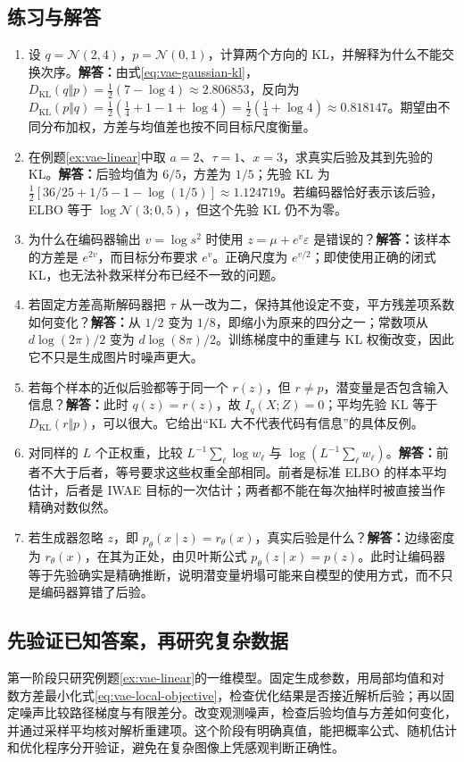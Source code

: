 \documentclass[UTF8,12pt,a4paper,fontset=fandol]{ctexart}
\begin{document}
\subsection{练习与解答}
\begin{enumerate}
 \item 设 $q=\mathcal N(2,4)$，$p=\mathcal N(0,1)$，计算两个方向的 KL，并解释为什么不能交换次序。\textbf{解答：}由式\eqref{eq:vae-gaussian-kl}，$D_{\mathrm{KL}}(q\Vert p)=\tfrac12(7-\log4)\approx2.806853$，反向为 $D_{\mathrm{KL}}(p\Vert q)=\tfrac12(\tfrac14+1-1+\log4)=\tfrac12(\tfrac14+\log4)\approx0.818147$。期望由不同分布加权，方差与均值差也按不同目标尺度衡量。
 \item 在例题\ref{ex:vae-linear}中取 $a=2$、$\tau=1$、$x=3$，求真实后验及其到先验的 KL。\textbf{解答：}后验均值为 $6/5$，方差为 $1/5$；先验 KL 为 $\tfrac12[36/25+1/5-1-\log(1/5)]\approx1.124719$。若编码器恰好表示该后验，ELBO 等于 $\log\mathcal N(3;0,5)$，但这个先验 KL 仍不为零。
 \item 为什么在编码器输出 $v=\log s^2$ 时使用 $z=\mu+e^v\varepsilon$ 是错误的？\textbf{解答：}该样本的方差是 $e^{2v}$，而目标分布要求 $e^v$。正确尺度为 $e^{v/2}$；即使使用正确的闭式 KL，也无法补救采样分布已经不一致的问题。
 \item 若固定方差高斯解码器把 $\tau$ 从一改为二，保持其他设定不变，平方残差项系数如何变化？\textbf{解答：}从 $1/2$ 变为 $1/8$，即缩小为原来的四分之一；常数项从 $d\log(2\pi)/2$ 变为 $d\log(8\pi)/2$。训练梯度中的重建与 KL 权衡改变，因此它不只是生成图片时噪声更大。
 \item 若每个样本的近似后验都等于同一个 $r(z)$，但 $r\ne p$，潜变量是否包含输入信息？\textbf{解答：}此时 $q(z)=r(z)$，故 $I_q(X;Z)=0$；平均先验 KL 等于 $D_{\mathrm{KL}}(r\Vert p)$，可以很大。它给出“KL 大不代表代码有信息”的具体反例。
 \item 对同样的 $L$ 个正权重，比较 $L^{-1}\sum_\ell\log w_\ell$ 与 $\log(L^{-1}\sum_\ell w_\ell)$。\textbf{解答：}前者不大于后者，等号要求这些权重全部相同。前者是标准 ELBO 的样本平均估计，后者是 IWAE 目标的一次估计；两者都不能在每次抽样时被直接当作精确对数似然。
 \item 若生成器忽略 $z$，即 $p_\theta(x\mid z)=r_\theta(x)$，真实后验是什么？\textbf{解答：}边缘密度为 $r_\theta(x)$，在其为正处，由贝叶斯公式 $p_\theta(z\mid x)=p(z)$。此时让编码器等于先验确实是精确推断，说明潜变量坍塌可能来自模型的使用方式，而不只是编码器算错了后验。
\end{enumerate}

\subsection{先验证已知答案，再研究复杂数据}
第一阶段只研究例题\ref{ex:vae-linear}的一维模型。固定生成参数，用局部均值和对数方差最小化式\eqref{eq:vae-local-objective}，检查优化结果是否接近解析后验；再以固定噪声比较路径梯度与有限差分。改变观测噪声，检查后验均值与方差如何变化，并通过采样平均核对解析重建项。这个阶段有明确真值，能把概率公式、随机估计和优化程序分开验证，避免在复杂图像上凭感观判断正确性。
\end{document}
